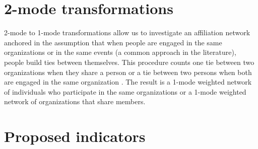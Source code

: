 \documentclass[a4paper, 12pt, openright, oneside, german, french, brazil, english]{abntex2}
\begin{document}
	
	\section{2-mode transformations}

        2-mode to 1-mode transformations allow us to investigate an affiliation network anchored in the assumption that when people are engaged in the same organizations or in the same events (a common approach in the literature), people build ties between themselves. This procedure counts one tie between two organizations when they share a person or a tie between two persons when both are engaged in the same organization \cite{brailly2016market,lazega2014redes}. The result is a 1-mode weighted network of individuals who participate in the same organizations or a 1-mode weighted network of organizations that share members.
	


       	\section{Proposed indicators}
	
	
\end{document}
